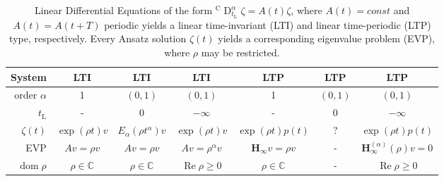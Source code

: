\documentclass{svproc}
\newcommand{\CderivativeInput}[2]{{}^\mathrm{C}\operatorname{D}_{#2}^{#1}}
\newcommand{\hMat}{\mathbf H}
\begin{document}
			\begin{table}[ht]
				\centering
				\caption{ Linear Differential Equations of the form $\CderivativeInput{\alpha}{t_\mathrm L} \zeta= A(t)\zeta$, where $A(t)=const$ and $A(t) = A(t+T)$ periodic yields a linear time-invariant (LTI) and linear time-periodic (LTP) type, respectively. Every Ansatz solution $\zeta(t)$ yields a corresponding eigenvalue problem (EVP), where $\rho$ may be restricted. }\vspace{.15cm}
					\begin{tabular}{r|ccc|ccc}\hline
					System& {LTI} &{LTI} &{LTI}  & {LTP}&{LTP} &{LTP}                            \\ \hline
					order $\alpha$	& {1} & {$(0,1)$} & {$(0,1)$}   & {1} & {$(0,1)$} & {$(0,1)$}    \\
					$t_\mathrm L$	& {-} & {$0$} & $-\infty$ & {-} & {$\quad 0\quad $} &  $-\infty$\\ 
					$\zeta(t)$& {$\exp(\rho t)v$} & {$E_\alpha(\rho t^\alpha)v$} &$\exp(\rho t)v$  & {$\exp(\rho t)p(t)$} & {?} & $\exp(\rho t)p(t)$ \\ 
					EVP& {$Av = \rho v$} & {$Av = \rho v$}                         &$Av=\rho^\alpha v$  & {$\hMat_\infty v = \rho v$} & {-} & $\hMat_\infty^{(\alpha)}(\rho)v = 0$ \\ 
					$\operatorname{dom}\rho$ 	& {$\rho \in \mathbb C$} &{$\rho \in \mathbb C$}                         & $\operatorname{Re} \rho \geq 0$ & {$\rho \in \mathbb C$} & {-} & $\operatorname{Re} \rho \geq 0$ \\ \hline
					\end{tabular}\label{tab_summary}
			\end{table}
						
\end{document}
